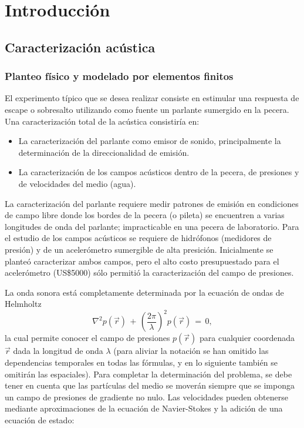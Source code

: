 \chapter{Introducción} 

\section{Caracterización acústica}

\subsection{Planteo físico y modelado por elementos finitos}

El experimento típico que se desea realizar consiste en estimular una respuesta de escape o sobresalto utilizando como fuente un parlante sumergido en la pecera. Una caracterización total de la acústica consistiría en:
\begin{itemize}
	\item La caracterización del parlante como emisor de sonido, principalmente la determinación de la direccionalidad de emisión.
	\item La caracterización de los campos acústicos dentro de la pecera, de presiones y de velocidades del medio (agua).
\end{itemize}
La caracterización del parlante requiere medir patrones de emisión en condiciones de campo libre donde los bordes de la pecera (o pileta) se encuentren a varias longitudes de onda del parlante; impracticable en una pecera de laboratorio. Para el estudio de los campos acústicos se requiere de hidrófonos (medidores de presión) y de un acelerómetro sumergible de alta presición. Inicialmente se planteó caracterizar ambos campos, pero el alto costo presupuestado para el acelerómetro (US\$5000) sólo permitió la caracterización del campo de presiones.

La onda sonora está completamente determinada por la ecuación de ondas de Helmholtz
\begin{equation}
	\nabla^2p(\vec{r})\,+\,\left(\frac{2\pi}{\lambda}\right)^2p(\vec{r})\,=\,0,
	\label{eq:helmholtz}
\end{equation}
la cual permite conocer el campo de presiones $p(\vec{r})$ para cualquier coordenada $\vec{r}$ dada la longitud de onda $\lambda$ (para aliviar la notación se han omitido las dependencias temporales en todas las fórmulas, y en lo siguiente también se omitirán las espaciales). Para completar la determinación del problema, se debe tener en cuenta que las partículas del medio se moverán siempre que se imponga un campo de presiones de gradiente no nulo. Las velocidades pueden obtenerse mediante aproximaciones de la ecuación de Navier-Stokes y la adición de una ecuación de estado:

